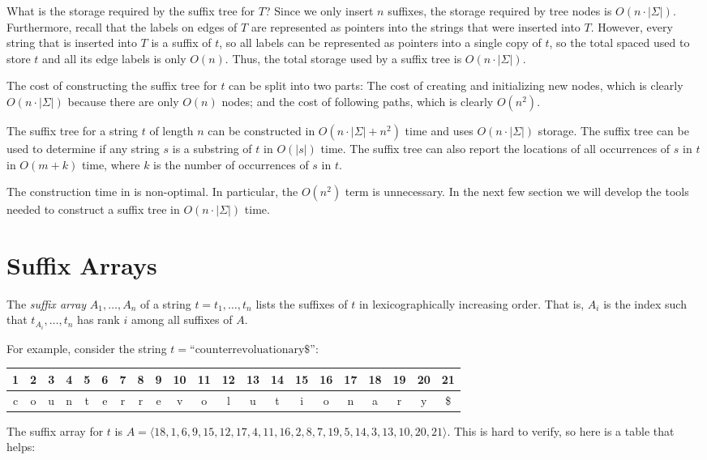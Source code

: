 What is the storage required by the suffix tree for $T$?  Since we
only insert $n$ suffixes, the storage required by tree nodes is
$O(n\cdot|\Sigma|)$.  Furthermore, recall that the labels on edges of $T$
are represented as pointers into the strings that were inserted into $T$.
However, every string that is inserted into $T$ is a suffix of $t$, so
all labels can be represented as pointers into a single copy of $t$, so
the total spaced used to store $t$ and all its edge labels is only $O(n)$.
Thus, the total storage used by a suffix tree is $O(n\cdot|\Sigma|)$.

The cost of constructing the suffix tree for $t$ can be split into two
parts:  The cost of creating and initializing new nodes, which is clearly
$O(n\cdot|\Sigma|)$ because there are only $O(n)$ nodes; and the cost
of following paths, which is clearly $O(n^2)$.

\begin{thm}
The suffix tree for a string $t$ of length $n$ can be constructed
in $O(n\cdot|\Sigma|+n^2)$ time and uses $O(n\cdot|\Sigma|)$ storage.
The suffix tree can be used to determine if any string $s$ is a substring
of $t$ in $O(|s|)$ time.  The suffix tree can also report the locations
of all occurrences of $s$ in $t$ in $O(m+k)$ time, where $k$ is the
number of occurrences of $s$ in $t$.
\end{thm}

The construction time in  is non-optimal.
In particular, the $O(n^2)$ term is unnecessary. In the next few section
we will develop the tools needed to construct a suffix tree in 
$O(n\cdot|\Sigma|)$ time.


\section{Suffix Arrays}

The \emph{suffix array} $A_1,\ldots,A_n$ of a string $t=t_1,\ldots,t_n$ lists
the suffixes of $t$ in lexicographically increasing order.  That is,
$A_i$ is the index such that $t_{A_{i}},\ldots,t_n$ has rank $i$ among
all suffixes of $A$.  

For example, consider the string $t=\text{``counterrevoluationary\$}$'':
\begin{center}
  \begin{tabular}{|c|c|c|c|c|c|c|c|c|c|c|c|c|c|c|c|c|c|c|c|c|}\hline
     1&2&3&4&5&6&7&8&9&10&11&12&13&14&15&16&17&18&19&20&21\\\hline
     c&o&u&n&t&e&r&r&e&v&o&l&u&t&i&o&n&a&r&y&\$\\\hline
  \end{tabular}
\end{center}
The suffix array for $t$ is
$A=\langle18,1,6,9,15,12,17,4,11,16,2,8,7,19,5,14,3,13,10,20,21\rangle$.  This is hard to verify, so here is a table that helps:

